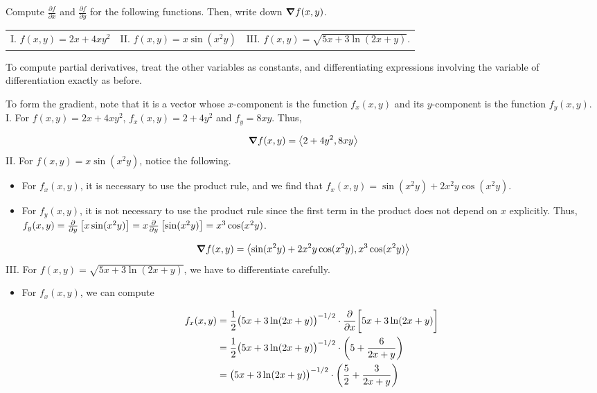 \documentclass[noauthor,handout]{ximera}
\newcommand{\pderiv}[2]{\frac{\partial #1}{\partial #2}}
\begin{document}
\begin{problem}
Compute $\pderiv{f}{x}$ and $\pderiv{f}{y}$ for the following functions.  Then, write down $\boldsymbol\nabla{f}(x,y)$.
\begin{center}
\begin{tabular}{lll}
I. $f(x,y) = 2x+4xy^2$ \qquad & II. $f(x,y) = x \sin(x^2y)$ \qquad & III. $f(x,y) = \sqrt{5x+3\ln(2x+y)}$.
\end{tabular}
\end{center}

\begin{freeResponse}
To compute partial derivatives, treat the other variables as constants, and differentiating expressions involving the variable of differentiation exactly as before.  

To form the gradient, note that it is a vector whose $x$-component is the function $f_x(x,y)$ and its $y$-component is the function $f_y(x,y)$.
I. For $f(x,y) = 2x+4xy^2$, $f_x(x,y) = 2+4y^2$ and $f_y=8xy$.  Thus, 

\[
\boldsymbol\nabla{f}(x,y) = \left\langle 2+4y^2, 8xy\right\rangle
\]
II. For $f(x,y) = x\sin(x^2y)$, notice the following.

\begin{itemize}
\item For $f_x(x,y)$, it is necessary to use the product rule, and we find that $f_x(x,y) = \sin(x^2y)+2x^2y \cos(x^2y)$.
\item For $f_y(x,y)$, it is not necessary to use the product rule since the first term in the product does not depend on $x$ explicitly.  Thus, $f_y(x,y) = \frac{\partial }{\partial y}\left[x \sin(x^2y)\right]= x\frac{\partial }{\partial y}\left[ \sin(x^2y)\right] = x^3\cos(x^2y)$.
\end{itemize}
 
\[
\boldsymbol\nabla{f}(x,y) = \left\langle \sin(x^2y)+2x^2y \cos(x^2y), x^3\cos(x^2y)\right\rangle
\]
III. For $f(x,y) = \sqrt{5x+3\ln(2x+y)}$, we have to differentiate carefully.

\begin{itemize}
\item For $f_x(x,y)$, we can compute

\begin{align*}
f_x(x,y) &= \frac{1}{2}\big( 5x+3\ln(2x+y) \big)^{-1/2} \cdot \frac{\partial }{\partial x} \bigg[ 5x+3\ln(2x+y)\bigg] \\
&= \frac{1}{2}\big( 5x+3\ln(2x+y) \big)^{-1/2} \cdot \left(5+\frac{6}{2x+y}\right) \\
&=\big( 5x+3\ln(2x+y) \big)^{-1/2} \cdot \left(\frac{5}{2}+\frac{3}{2x+y}\right) \\
\end{align*}


\end{itemize}
\end{freeResponse}
\end{problem}
\end{document}
